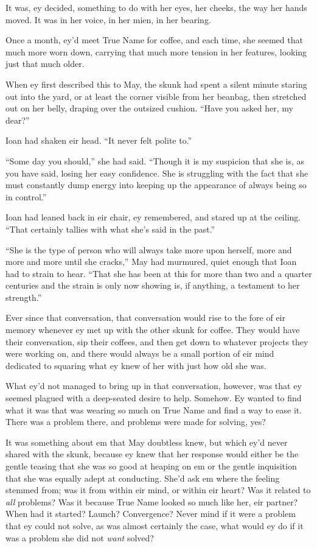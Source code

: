 It was, ey decided, something to do with her eyes, her cheeks, the way her hands moved. It was in her voice, in her mien, in her bearing.

Once a month, ey'd meet True Name for coffee, and each time, she seemed that much more worn down, carrying that much more tension in her features, looking just that much older.

When ey first described this to May, the skunk had spent a silent minute staring out into the yard, or at least the corner visible from her beanbag, then stretched out on her belly, draping over the outsized cushion. ``Have you asked her, my dear?''

Ioan had shaken eir head. ``It never felt polite to.''

``Some day you should,'' she had said. ``Though it is my suspicion that she is, as you have said, losing her easy confidence. She is struggling with the fact that she must constantly dump energy into keeping up the appearance of always being so in control.''

Ioan had leaned back in eir chair, ey remembered, and stared up at the ceiling. ``That certainly tallies with what she's said in the past.''

``She is the type of person who will always take more upon herself, more and more and more until she cracks,'' May had murmured, quiet enough that Ioan had to strain to hear. ``That she has been at this for more than two and a quarter centuries and the strain is only now showing is, if anything, a testament to her strength.''

Ever since that conversation, that conversation would rise to the fore of eir memory whenever ey met up with the other skunk for coffee. They would have their conversation, sip their coffees, and then get down to whatever projects they were working on, and there would always be a small portion of eir mind dedicated to squaring what ey knew of her with just how old she was.

What ey'd not managed to bring up in that conversation, however, was that ey seemed plagued with a deep-seated desire to help. Somehow. Ey wanted to find what it was that was wearing so much on True Name and find a way to ease it. There was a problem there, and problems were made for solving, yes?

It was something about em that May doubtless knew, but which ey'd never shared with the skunk, because ey knew that her response would either be the gentle teasing that she was so good at heaping on em or the gentle inquisition that she was equally adept at conducting. She'd ask em where the feeling stemmed from; was it from within eir mind, or within eir heart? Was it related to \emph{all} problems? Was it because True Name looked so much like her, eir partner? When had it started? Launch? Convergence? Never mind if it were a problem that ey could not solve, as was almost certainly the case, what would ey do if it was a problem she did not \emph{want} solved?

